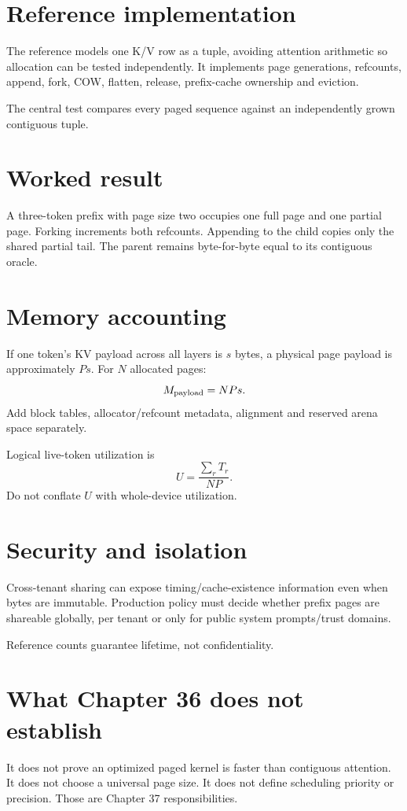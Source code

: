 \section{Reference implementation}
The reference models one K/V row as a tuple, avoiding attention arithmetic so allocation can be tested independently. It implements page generations, refcounts, append, fork, COW, flatten, release, prefix-cache ownership and eviction.

The central test compares every paged sequence against an independently grown contiguous tuple.

\section{Worked result}
A three-token prefix with page size two occupies one full page and one partial page. Forking increments both refcounts. Appending to the child copies only the shared partial tail. The parent remains byte-for-byte equal to its contiguous oracle.

\section{Memory accounting}
If one token's KV payload across all layers is $s$ bytes, a physical page payload is approximately $Ps$. For $N$ allocated pages:
\[
M_{\rm payload}=NPs.
\]
Add block tables, allocator/refcount metadata, alignment and reserved arena space separately.

Logical live-token utilization is
\[
U=\frac{\sum_r T_r}{NP}.
\]
Do not conflate $U$ with whole-device utilization.

\section{Security and isolation}
Cross-tenant sharing can expose timing/cache-existence information even when bytes are immutable. Production policy must decide whether prefix pages are shareable globally, per tenant or only for public system prompts/trust domains.

Reference counts guarantee lifetime, not confidentiality.

\section{What Chapter 36 does not establish}
It does not prove an optimized paged kernel is faster than contiguous attention. It does not choose a universal page size. It does not define scheduling priority or precision. Those are Chapter 37 responsibilities.


